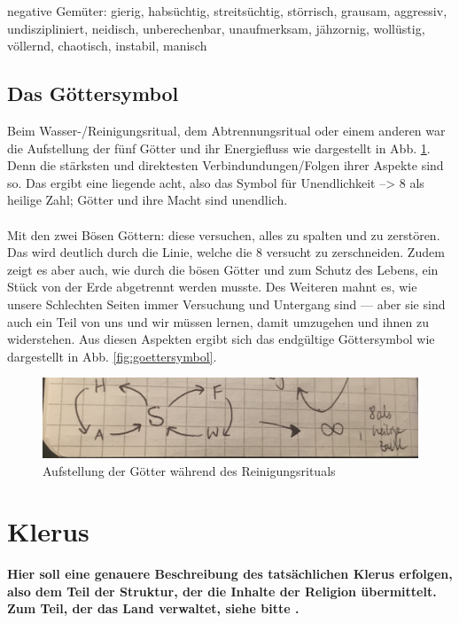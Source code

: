 negative Gemüter: gierig,  habsüchtig,  streitsüchtig, störrisch, grausam, aggressiv, undiszipliniert, neidisch, unberechenbar, unaufmerksam, jähzornig, wollüstig, völlernd, 
chaotisch, instabil, manisch

\subsection{Das Göttersymbol} \label{sec:goettersymbol}
Beim Wasser-/Reinigungsritual, dem Abtrennungsritual oder einem anderen war die Aufstellung der fünf Götter und ihr Energiefluss wie dargestellt in Abb. \ref{fig:goetteraufstellung}. Denn die stärksten und direktesten Verbindundungen/Folgen ihrer Aspekte sind so. Das ergibt eine liegende acht, also das Symbol für Unendlichkeit --> 8 als heilige Zahl; Götter und ihre Macht sind unendlich.\\
\\
Mit den zwei Bösen Göttern: diese versuchen, alles zu spalten und zu zerstören. Das wird deutlich durch die Linie, welche die 8 versucht zu zerschneiden. Zudem zeigt es aber auch, wie durch die bösen Götter und zum Schutz des Lebens, ein Stück von der Erde abgetrennt werden musste. Des Weiteren mahnt es, wie unsere Schlechten Seiten immer Versuchung und Untergang sind — aber sie sind auch ein Teil von uns und wir müssen lernen, damit umzugehen und ihnen zu widerstehen. Aus diesen Aspekten ergibt sich das endgültige Göttersymbol wie dargestellt in Abb. \ref{fig:goettersymbol}.\\

\begin{figure}
	\centering
	\includegraphics[width=0.7\linewidth]{Abbildungen/Gesellschaft/GoetteraufstellungbeiReinigungsritual}
	\caption{Aufstellung der Götter während des Reinigungsrituals}
	\label{fig:goetteraufstellung}
\end{figure}

\section{Klerus}
\textbf{Hier soll eine genauere Beschreibung des tatsächlichen Klerus erfolgen, also dem Teil der Struktur, der die Inhalte der Religion übermittelt. Zum Teil, der das Land verwaltet, siehe bitte .} 

